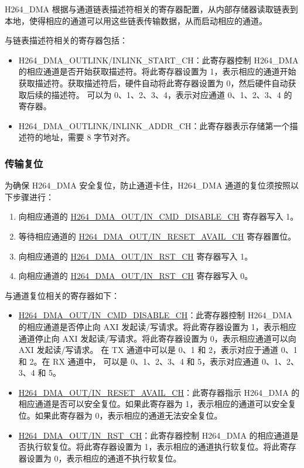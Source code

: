 \documentclass[main\_\_CN.tex]{subfiles}
\begin{document}
H264\_DMA 根据与通道链表描述符相关的寄存器配置，从内部存储器读取链表到本地，使得相应的通道可以用这些链表传输数据，从而启动相应的通道。

与链表描述符相关的寄存器包括：
\begin{itemize}
    \item H264\_DMA\_OUTLINK/INLINK\_START\_CH：此寄存器控制 H264\_DMA 的相应通道是否开始获取描述符。将此寄存器设置为 1，表示相应的通道开始获取描述符。获取描述符后，硬件自动将此寄存器设置为 0，然后硬件自动获取后续的描述符。 可以为 0、1、2、3、4，表示对应通道 0、1、2、3、4 的寄存器。
    \item H264\_DMA\_OUTLINK/INLINK\_ADDR\_CH：此寄存器表示存储第一个描述符的地址，需要 8 字节对齐。

\end{itemize}

\subsubsection{传输复位}\label{sec:h264-dma-reset}
为确保 H264\_DMA 安全复位，防止通道卡住，H264\_DMA 通道的复位须按照以下步骤进行：
\begin{enumerate}
    \item 向相应通道的 \hyperref[fielddesc:H264DMAOUTCMDDISABLECH0]{H264\_DMA\_OUT/IN\_CMD\_DISABLE\_CH} 寄存器写入 1。
    \item 等待相应通道的 \hyperref[fielddesc:H264DMAOUTRESETAVAILCH0]{H264\_DMA\_OUT/IN\_RESET\_AVAIL\_CH} 寄存器置位。
    \item 向相应通道的 \hyperref[fielddesc:H264DMAOUTRSTCH0]{H264\_DMA\_OUT/IN\_RST\_CH} 寄存器写入 1。
    \item 向相应通道的 \hyperref[fielddesc:H264DMAOUTRSTCH0]{H264\_DMA\_OUT/IN\_RST\_CH} 寄存器写入 0。
\end{enumerate}

与通道复位相关的寄存器如下：
\begin{itemize}
    \item \hyperref[fielddesc:H264DMAOUTCMDDISABLECH0]{H264\_DMA\_OUT/IN\_CMD\_DISABLE\_CH}：此寄存器控制 H264\_DMA 的相应通道是否停止向 AXI 发起读/写请求。将此寄存器设置为 1，表示相应通道停止向 AXI 发起读/写请求。将此寄存器设置为 0，表示相应通道可以向 AXI 发起读/写请求。 在 TX 通道中可以是 0、1 和 2，表示对应于通道 0、1 和 2。在 RX 通道中， 可以是 0、1、2、3、4 和 5，表示对应通道 0、1、2、3、4 和 5。
    \item \hyperref[fielddesc:H264DMAOUTRESETAVAILCH0]{H264\_DMA\_OUT/IN\_RESET\_AVAIL\_CH}：此寄存器指示 H264\_DMA 的相应通道是否可以安全复位。如果此寄存器为 1，表示相应的通道可以安全复位。如果此寄存器为 0，表示相应的通道无法安全复位。
    \item \hyperref[fielddesc:H264DMAOUTRSTCH0]{H264\_DMA\_OUT/IN\_RST\_CH}：此寄存器控制 H264\_DMA 的相应通道是否执行软复位。将此寄存器设置为 1，表示相应的通道执行软复位。将此寄存器设置为 0，表示相应的通道不执行软复位。
\end{itemize}
\end{document}
